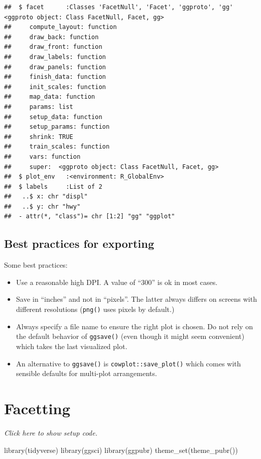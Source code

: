 \documentclass[]{book}
\newenvironment{Shaded}{}{}
\newcommand{\KeywordTok}[1]{\textcolor[rgb]{0.00,0.00,1.00}{#1}}
\newcommand{\NormalTok}[1]{#1}
\begin{document}
\begin{verbatim}
##  $ facet      :Classes 'FacetNull', 'Facet', 'ggproto', 'gg' <ggproto object: Class FacetNull, Facet, gg>
##     compute_layout: function
##     draw_back: function
##     draw_front: function
##     draw_labels: function
##     draw_panels: function
##     finish_data: function
##     init_scales: function
##     map_data: function
##     params: list
##     setup_data: function
##     setup_params: function
##     shrink: TRUE
##     train_scales: function
##     vars: function
##     super:  <ggproto object: Class FacetNull, Facet, gg> 
##  $ plot_env   :<environment: R_GlobalEnv> 
##  $ labels     :List of 2
##   ..$ x: chr "displ"
##   ..$ y: chr "hwy"
##  - attr(*, "class")= chr [1:2] "gg" "ggplot"
\end{verbatim}

\hypertarget{best-practices-for-exporting}{%
\subsection{Best practices for exporting}\label{best-practices-for-exporting}}

Some best practices:

\begin{itemize}
\item
  Use a reasonable high DPI. A value of ``300'' is ok in most cases.
\item
  Save in ``inches'' and not in ``pixels''. The latter always differs on screens with different resolutions (\texttt{png()} uses pixels by default.)
\item
  Always specify a file name to ensure the right plot is chosen. Do not rely on the default behavior of \texttt{ggsave()} (even though it might seem convenient) which takes the last visualized plot.
\item
  An alternative to \texttt{ggsave()} is \texttt{cowplot::save\_plot()} which comes with sensible defaults for multi-plot arrangements.
\end{itemize}

\hypertarget{facetting}{%
\section{Facetting}\label{facetting}}

\emph{Click here to show setup code.}

\begin{Shaded}
\begin{Highlighting}[]
\KeywordTok{library}\NormalTok{(tidyverse)}
\KeywordTok{library}\NormalTok{(ggsci)}
\KeywordTok{library}\NormalTok{(ggpubr)}
\KeywordTok{theme_set}\NormalTok{(}\KeywordTok{theme_pubr}\NormalTok{())}
\end{Highlighting}
\end{Shaded}
\end{document}

